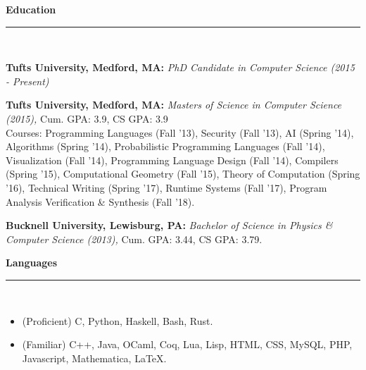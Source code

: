 {\large\bf Education}\\[-.3cm]
\rule{\linewidth}{.5pt}\\[.2cm]
\begin{minipage}{\linewidth}

{\bf Tufts University, Medford, MA:}
{\it PhD Candidate in Computer Science (2015 - Present)}

{\bf Tufts University, Medford, MA:}
{\it Masters of Science in Computer Science (2015),} Cum. GPA: 3.9, CS GPA: 3.9\\
Courses: Programming Languages (Fall '13), Security (Fall '13), AI (Spring
'14), Algorithms (Spring '14), Probabilistic Programming Languages (Fall '14),
Visualization (Fall '14), Programming Language Design (Fall '14), Compilers
(Spring '15), Computational Geometry (Fall '15), Theory of Computation (Spring
'16), Technical Writing (Spring '17), Runtime Systems (Fall '17), Program
Analysis Verification \& Synthesis (Fall '18).

{\bf Bucknell University, Lewisburg, PA:}
{\it Bachelor of Science in Physics \& Computer Science (2013),} %
Cum. GPA: 3.44, CS GPA: 3.79.\\
\end{minipage}

\vspace{-.4cm}
{\large\bf Languages}\\[-.3cm]
\rule{\linewidth}{.5pt}\\[.2cm]
\begin{minipage}{\linewidth}

\begin{itemize}[leftmargin=.5cm]
\item (Proficient) C, Python, Haskell, Bash, Rust.
\item (Familiar) C++, Java, OCaml, Coq, Lua, Lisp,
HTML, CSS, MySQL, PHP, Javascript, Mathematica, \LaTeX.
\end{itemize}

\end{minipage}

